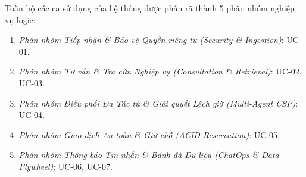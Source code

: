 Toàn bộ các ca sử dụng của hệ thống được phân rã thành 5 phân nhóm nghiệp vụ logic:
\begin{enumerate}
    \item \textit{Phân nhóm Tiếp nhận \& Bảo vệ Quyền riêng tư (Security \& Ingestion)}: UC-01.
    \item \textit{Phân nhóm Tư vấn \& Tra cứu Nghiệp vụ (Consultation \& Retrieval)}: UC-02, UC-03.
    \item \textit{Phân nhóm Điều phối Đa Tác tử \& Giải quyết Lệch giờ (Multi-Agent CSP)}: UC-04.
    \item \textit{Phân nhóm Giao dịch An toàn \& Giữ chỗ (ACID Reservation)}: UC-05.
    \item \textit{Phân nhóm Thông báo Tin nhắn \& Bánh đà Dữ liệu (ChatOps \& Data Flywheel)}: UC-06, UC-07.
\end{enumerate}

